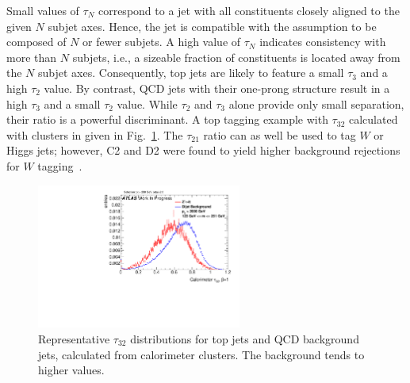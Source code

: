 Small values of $\tau_N$ correspond to a jet with all constituents closely aligned to the given $N$ subjet axes. Hence, the jet is compatible with the assumption to be composed of $N$ or fewer subjets. A high value of $\tau_N$ indicates consistency with more than $N$ subjets, i.e., a sizeable fraction of constituents is located away from the $N$ subjet axes. 
Consequently, top jets are likely to feature a small $\tau_3$ and a high $\tau_2$ value. By contrast, QCD jets with their one-prong structure result in a high $\tau_{3}$ and a small $\tau_{2}$ value. While $\tau_2$ and $\tau_3$ alone provide only small separation, their ratio is a powerful discriminant. A top tagging example with $\tau_{32}$ calculated with clusters in given in Fig.~\ref{fig:nSub_example}. The $\tau_{21}$ ratio can as well be used to tag $W$ or Higgs jets; however, C2 and D2 were found to yield higher background rejections for $W$ tagging~\cite{bib:w_tagging}. 
\begin{figure}
\centering
\includegraphics[width=0.6\textwidth]{sascha_input/plots/Top/Beta1/h_recoJet_nSub32_bin6.pdf}
\caption{Representative $\tau_{32}$ distributions for top jets and QCD background jets, calculated from calorimeter clusters. The background tends to higher values.}\label{fig:nSub_example}
\end{figure}


